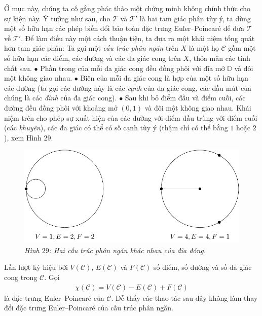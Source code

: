 \begin{multicols}{2}
	Ở mục này, chúng ta cố gắng phác thảo một chứng minh không chính thức cho sự kiện này. Ý tưởng như sau, cho $\mathscr{T}$ và $\mathscr{T}'$ là hai tam giác phân tùy ý, ta dùng một số hữu hạn các phép biến đổi bảo toàn đặc trưng Euler--Poincar\'e để đưa $\mathscr{T}$ về $\mathscr{T}'$. Để làm điều này một cách thuận tiện, ta đưa ra một khái niệm tổng quát hơn tam giác phân: Ta gọi một {\it cấu trúc phân ngăn} trên $X$ là một họ $\mathscr{C}$ gồm một số hữu hạn các điểm, các đường và các đa giác cong trên $X$, thỏa mãn các tính chất sau.
	\vskip 0.1cm
	$\bullet$ Phần trong của mỗi đa giác cong đều đồng phôi với đĩa mở $\mathbb{D}$ và đôi một không giao nhau.
	\vskip 0.1cm
	$\bullet$ Biên của mỗi đa giác cong là hợp của một số hữu hạn các đường (ta gọi các đường này là các {\it cạnh} của đa giác cong, các đầu mút của chúng là các {\it đỉnh} của đa giác cong).
	\vskip 0.1cm
	$\bullet$ Sau khi bỏ điểm đầu và điểm cuối, các đường đều đồng phôi với khoảng mở $(0,1)$ và đôi một không giao nhau.
	\vskip 0.1cm
	Khái niệm trên cho phép sự xuất hiện của các đường với điểm đầu trùng với điểm cuối (các {\it khuyên}), các đa giác có thể có số cạnh tùy ý (thậm chí có thể bằng $1$ hoặc $2$), xem Hình $29$.
	\begin{figure}[H]
		\vspace*{-5pt}
		\centering\captionsetup{labelformat=empty, justification=centering}
		\includegraphics[width=1\linewidth]{H29.pdf}
		\caption{\small\textit{\color{duongvaotoanhoc}Hình $29$: Hai cấu trúc phân ngăn khác nhau của đĩa đóng.}}
		\vspace*{-10pt}
	\end{figure}
	Lần lượt ký hiệu bởi $V(\mathscr{C})$, $E(\mathscr{C})$ và $F(\mathscr{C})$ số điểm, số đường và số đa giác cong trong $\mathscr{C}$. Gọi
	\begin{align*}
		\chi(\mathscr{C}) = V(\mathscr{C}) - E(\mathscr{C}) + F(\mathscr{C})
	\end{align*}
	là đặc trưng Euler--Poincar\'e của $\mathscr{C}$. Dễ thấy các thao tác sau đây không làm thay đổi đặc trưng Euler--Poincar\'e của cấu trúc phân ngăn.

\end{multicols}
